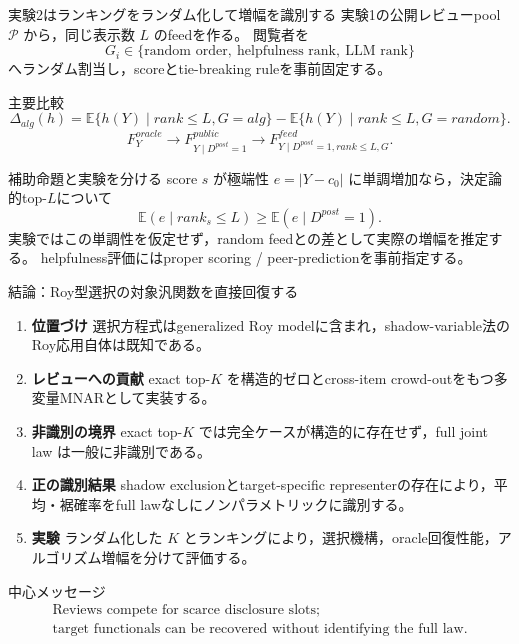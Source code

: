 \documentclass[aspectratio=169,10pt]{beamer}
\newcommand{\E}{\mathbb{E}}
\newcommand{\1}{\mathbf{1}}
\begin{document}
\begin{frame}[shrink=7]{実験2はランキングをランダム化して増幅を識別する}
実験1の公開レビューpool $\mathcal P$ から，同じ表示数 $L$ のfeedを作る。
閲覧者を
\[
G_i\in\{\text{random order},\ \text{helpfulness rank},\ \text{LLM rank}\}
\]
へランダム割当し，scoreとtie-breaking ruleを事前固定する。
\begin{block}{主要比較}
\[
\Delta_{alg}(h)
=
\E\{h(Y)\mid rank\le L,G=alg\}
-
\E\{h(Y)\mid rank\le L,G=random\}.
\]
\[
F_Y^{oracle}
\longrightarrow
F_{Y\mid D^{post}=1}^{public}
\longrightarrow
F_{Y\mid D^{post}=1,rank\le L,G}^{feed}.
\]
\end{block}
\begin{alertblock}{補助命題と実験を分ける}
score $s$ が極端性 $e=|Y-c_0|$ に単調増加なら，決定論的top-$L$について
\[
\E(e\mid rank_s\le L)\ge\E(e\mid D^{post}=1).
\]
実験ではこの単調性を仮定せず，random feedとの差として実際の増幅を推定する。
helpfulness評価にはproper scoring / peer-predictionを事前指定する。
\end{alertblock}
\end{frame}

\begin{frame}[shrink=6]{結論：Roy型選択の対象汎関数を直接回復する}
\begin{enumerate}
\item \textbf{位置づけ}\quad
選択方程式はgeneralized Roy modelに含まれ，shadow-variable法のRoy応用自体は既知である。
\item \textbf{レビューへの貢献}\quad
exact top-$K$ を構造的ゼロとcross-item crowd-outをもつ多変量MNARとして実装する。
\item \textbf{非識別の境界}\quad
exact top-$K$ では完全ケースが構造的に存在せず，full joint law は一般に非識別である。
\item \textbf{正の識別結果}\quad
shadow exclusionとtarget-specific representerの存在により，平均・裾確率をfull lawなしにノンパラメトリックに識別する。
\item \textbf{実験}\quad
ランダム化した $K$ とランキングにより，選択機構，oracle回復性能，アルゴリズム増幅を分けて評価する。
\end{enumerate}
\begin{alertblock}{中心メッセージ}
\[
\begin{gathered}
\text{Reviews compete for scarce disclosure slots;}\\
\text{target functionals can be recovered without identifying the full law.}
\end{gathered}
\]
\end{alertblock}
\end{frame}
\end{document}
